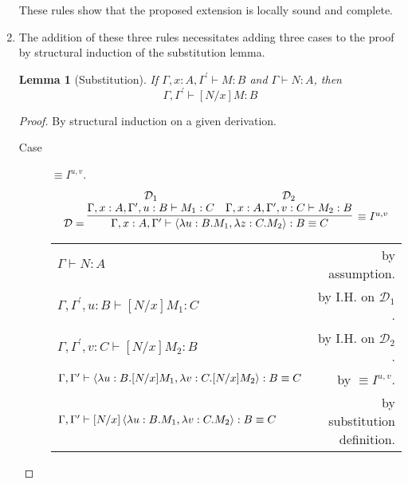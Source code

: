 \documentclass[11pt,letterpaper]{article}
\newtheorem{lemma}{Lemma}
\newcommand{\proves}{\vdash}
\begin{document}
\begin{enumerate}
        These rules show that the proposed extension is locally sound and
        complete.

    \item
        The addition of these three rules necessitates adding three cases to
        the proof by structural induction of the substitution lemma.

        \begin{lemma}[Substitution]
            If $\Gamma, x:A, \Gamma^\prime \proves M : B$
            and $\Gamma \proves N : A$, then
            $$
            \Gamma, \Gamma^\prime \proves [N/x]M : B
            $$
        \end{lemma}


        \begin{proof} By structural induction on a given derivation.

            \begin{description}
                \item[Case] $\equiv I^{u, v}$.
                    $$
                    \mathcal{D} = \infer[\equiv I^{u, v}]{
                        \Gamma, x:A, \Gamma^\prime
                        \proves
                        \equivproofterm{u}{B}{M_1}{z}{C}{M_2}
                    }{
                        \deduce[\mathcal{D}_1]{
                            \Gamma, x:A, \Gamma^\prime, u:B \proves M_1 : C
                        }{}
                        &
                        \deduce[\mathcal{D}_2]{
                            \Gamma, x:A, \Gamma^\prime, v:C \proves M_2 : B
                        }{}
                    }
                    $$

                    \begin{center}
                        \begin{tabular}{l r}
                            $\Gamma \proves N : A$
                            &
                            by assumption. \\
                            $\Gamma, \Gamma^\prime, u:B \proves [N/x]M_1 : C$
                            &
                            by I.H. on $\mathcal{D}_1$. \\
                            $\Gamma, \Gamma^\prime, v:C \proves [N/x]M_2 : B$
                            &
                            by I.H. on $\mathcal{D}_2$. \\
                            $
                            \Gamma, \Gamma^\prime
                            \proves
                            \equivproofterm{u}{B}{[N/x]M_1}{v}{C}{[N/x]M_2}
                            $
                            &
                            by $\equiv I^{u, v}$. \\
                            $
                            \Gamma, \Gamma^\prime
                            \proves
                            [N/x]\equivproofterm{u}{B}{M_1}{v}{C}{M_2}
                            $
                            &
                            by substitution definition. \\
                        \end{tabular}
                    \end{center}


\end{description}
\end{proof}
\end{enumerate}
\end{document}
